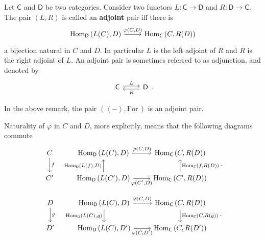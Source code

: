 \begin{defn}
	Let $\mathsf{C}$ and $\mathsf{D}$ be two categories.
	Consider two functors $L: \mathsf{C} \to \mathsf{D}$ and $R: \mathsf{D} \to \mathsf{C}$.
	The pair $\left(L, R\right)$ is called an \textbf{adjoint} pair iff there is
	\begin{equation}
	\begin{tikzcd}
		\mathrm{Hom}_{\mathsf{D}} \left( L(C), D \right) \arrow[r, "{\varphi(C,D)}", rightarrow] &
		\mathrm{Hom}_{\mathsf{C}} \left( C, R(D) \right)
	\end{tikzcd}
	\end{equation} 
	a bijection natural in $C$ and $D$.
	In particular $L$ is the left adjoint of $R$ and $R$ is the right adjoint of $L$.
	An adjoint pair is sometimes referred to as adjunction, and denoted by
	\begin{equation}
	\begin{tikzcd}
		\mathsf{C} \arrow[r, "L", rightarrow, shift left = .5ex] &
		\mathsf{D} \arrow[l, "R", rightarrow, shift left = .5ex] 
	\end{tikzcd}
	.\end{equation} 
\end{defn}

\begin{rem}
	In the above remark, the pair $\left(\left\langle - \right\rangle, \mathrm{For}\, \right)$ is an adjoint pair.
\end{rem} 

\begin{rem}
	Naturality of $\varphi$ in $C$ and $D$, more explicitly, means that the following diagrams commute
	\begin{equation}
	\begin{tikzcd}
		C \arrow[d, "f", rightarrow] &
		\mathrm{Hom}_{\mathsf{D}} \left( L(C), D \right) \arrow[r, "{\varphi(C,D)}", rightarrow] &
		\mathrm{Hom}_{\mathsf{C}} \left( C, R(D) \right)\\
		C' &
		\mathrm{Hom}_{\mathsf{D}} \left( L(C'), D \right) \arrow[r, "{\varphi(C',D)}"', rightarrow] 
		\arrow[u, "{\mathrm{Hom}_{\mathsf{D}} \left( L(f), D \right)}", rightarrow] &
		\mathrm{Hom}_{\mathsf{C}} \left( C', R(D) \right) 
		\arrow[u, "{\mathrm{Hom}_{\mathsf{C}} \left( f, R(D) \right)}"', rightarrow]
	\end{tikzcd}
	.\end{equation} 
	
	\begin{equation}
	\begin{tikzcd}
		D \arrow[d, "g", rightarrow] &
		\mathrm{Hom}_{\mathsf{D}} \left( L(C), D \right) \arrow[r, "{\varphi(C,D)}", rightarrow]
		\arrow[d, "{\mathrm{Hom}_{\mathsf{D}} \left( L(C), g \right)}"', rightarrow] &
		\mathrm{Hom}_{\mathsf{C}} \left( C, R(D) \right)
		\arrow[d, "{\mathrm{Hom}_{\mathsf{C}} \left( C, R(g) \right)}", rightarrow]\\
		D' &
		\mathrm{Hom}_{\mathsf{D}} \left( L(C), D' \right) \arrow[r, "{\varphi(C,D')}"', rightarrow] &
		\mathrm{Hom}_{\mathsf{C}} \left( C, R(D') \right) 
	\end{tikzcd}
	.\end{equation} 
\end{rem}

